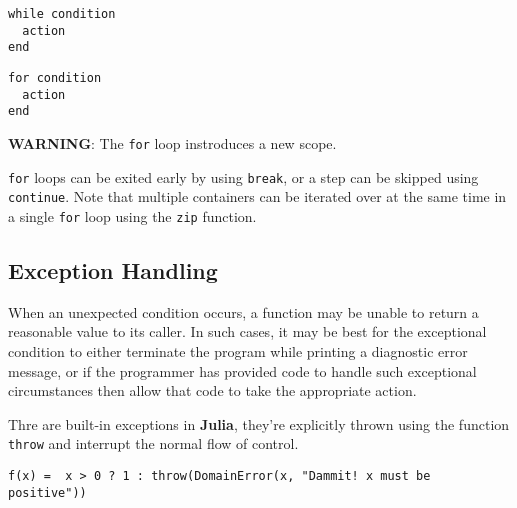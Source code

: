\documentclass[
]{article}
\begin{document}
\begin{verbatim}
while condition
  action
end
\end{verbatim}

\begin{verbatim}
for condition
  action
end
\end{verbatim}

\textbf{WARNING}: The \texttt{for} loop instroduces a new scope.

\texttt{for} loops can be exited early by using \texttt{break}, or a
step can be skipped using \texttt{continue}. Note that multiple
containers can be iterated over at the same time in a single
\texttt{for} loop using the \texttt{zip} function.

\hypertarget{exception-handling.}{%
\subsection{\texorpdfstring{Exception
Handling}{Exception Handling}}\label{exception-handling.}}

When an unexpected condition occurs, a function may be unable to return
a reasonable value to its caller. In such cases, it may be best for the
exceptional condition to either terminate the program while printing a
diagnostic error message, or if the programmer has provided code to
handle such exceptional circumstances then allow that code to take the
appropriate action.

Thre are built-in exceptions in \textbf{Julia}, they're explicitly
thrown using the function \texttt{throw} and interrupt the normal flow
of control.

\begin{verbatim}
f(x) =  x > 0 ? 1 : throw(DomainError(x, "Dammit! x must be positive"))
\end{verbatim}
\end{document}
